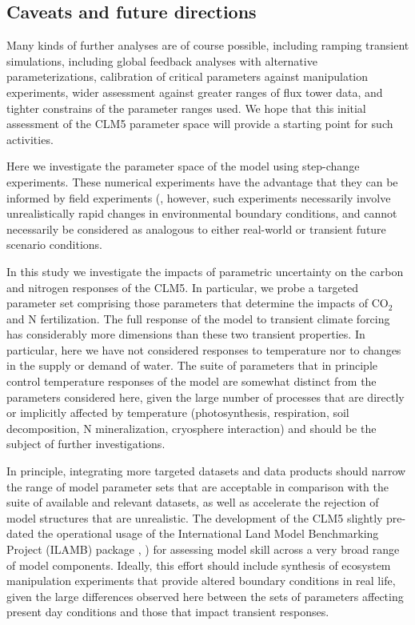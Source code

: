 \documentclass[draft,linenumbers]{agujournal}
\begin{document}
\subsection{Caveats and future directions}
Many kinds of further analyses are of course possible, including ramping transient simulations,  including global feedback analyses with alternative parameterizations, calibration of critical parameters against manipulation experiments, wider assessment against greater ranges of flux tower data, and tighter constrains of the parameter ranges used. We hope that this initial assessment of the CLM5 parameter space will provide a starting point for such activities. 

Here we investigate the parameter space of the model using step-change experiments. These numerical experiments have the advantage that they can be informed by field experiments (\cite{wieder2019}, however, such experiments necessarily involve unrealistically rapid changes in environmental boundary conditions, and cannot necessarily be considered as analogous to either real-world or transient future scenario conditions. 

In this study we investigate the impacts of parametric uncertainty on the carbon and nitrogen responses of the CLM5. In particular, we probe a targeted parameter set comprising those parameters that determine the impacts of CO$_{2}$ and N fertilization. The full response of the model to transient climate forcing has considerably more dimensions than these two transient properties. In particular, here we have not considered responses to temperature nor to changes in the supply or demand of water. The suite of parameters that in principle control temperature responses of the model are somewhat distinct from the parameters considered here, given the large number of processes that are directly or implicitly affected by temperature (photosynthesis, respiration, soil decomposition, N mineralization, cryosphere interaction) and should be the subject of further investigations. 

In principle, integrating more targeted datasets and data products should narrow the range of model parameter sets that are acceptable in comparison with the suite of available and relevant datasets, as well as accelerate the rejection of model structures that are unrealistic.  The development of the CLM5 slightly pre-dated the operational usage of the International Land Model Benchmarking Project (ILAMB) package \cite{collier2018}, \cite{lawrence2018}) for assessing model skill across a very broad range of model components.  Ideally, this effort should include synthesis of ecosystem manipulation experiments that provide altered boundary conditions in real life, given the large differences observed here between the sets of parameters affecting present day conditions and those that impact transient responses.
\end{document}
